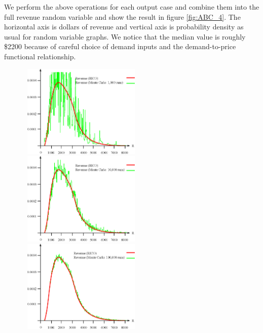 We perform the above operations for each output case and combine them into the full revenue random variable and show the result in figure \ref{fig:ABC_4}. The horizontal axis is dollars of revenue and vertical axis is probability density as usual for random variable graphs. We notice that the median value is roughly \$2200 because of careful choice of demand inputs and the demand-to-price functional relationship. 


\begin{figure}[ht]
\begin{minipage}[b]{0.5\linewidth}
\centering
\includegraphics[width=2.33in, height=1.75in]{Images/ABC_1K}
\end{minipage}
\begin{minipage}[b]{0.5\linewidth}
\centering
\includegraphics[width=2.33in, height=1.75in]{Images/ABC_10K}
\end{minipage}
\begin{minipage}[b]{0.5\linewidth}
\centering
\includegraphics[width=2.33in, height=1.75in]{Images/ABC_100K}
\end{minipage}
\begin{minipage}[b]{0.5\linewidth}

\end{minipage}
\end{figure}
